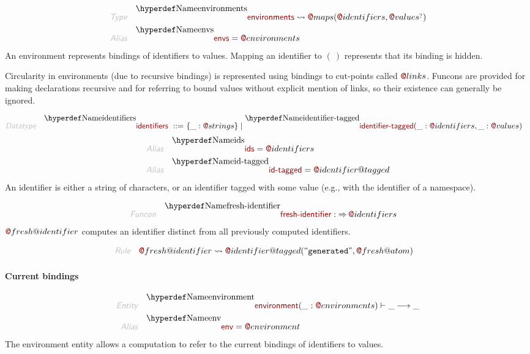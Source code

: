 \begin{align*}
  \KEY{Type} \quad 
  & \FUNDEC{environments}  
    \leadsto \FUN@maps
               (  \FUN@identifiers, 
                      \FUN@values\QUERY )
\\
  \KEY{Alias} \quad
  & \FUNDEC{envs} = \FUN@environments
\end{align*}
An environment represents bindings of identifiers to values.
  Mapping an identifier to $(   \  )$ represents that its binding is hidden.

Circularity in environments (due to recursive bindings) is represented using
  bindings to cut-points called $\FUN@links$. Funcons are provided for making
  declarations recursive and for referring to bound values without explicit
  mention of links, so their existence can generally be ignored.

\begin{align*}
  \KEY{Datatype} \quad 
  \FUNDEC{identifiers} 
  \ ::= \ &
  \{ \_ : \FUN@strings \} \mid \FUNDEC{identifier-tagged}(
                   \_ : \FUN@identifiers, \_ : \FUN@values)
\end{align*}
\begin{align*}
  \KEY{Alias} \quad
  & \FUNDEC{ids} = \FUN@identifiers
\\
  \KEY{Alias} \quad
  & \FUNDEC{id-tagged} = \FUN@identifier@tagged
\end{align*}
An identifier is either a string of characters, or an identifier tagged with
  some value (e.g., with the identifier of a namespace).

\begin{align*}
  \KEY{Funcon} \quad
  & \FUNDEC{fresh-identifier} 
    :  \TO \FUN@identifiers 
\end{align*}
$\FUN@fresh@identifier$ computes an identifier distinct from all previously
  computed identifiers.

\begin{align*}
  \KEY{Rule} \quad
    & \FUN@fresh@identifier \leadsto 
        \FUN@identifier@tagged
          (  \STRING{generated}, 
                 \FUN@fresh@atom )
\end{align*}
\paragraph{Current bindings}\hypertarget{current-bindings}{}\label{current-bindings}

\begin{align*}
  \KEY{Entity} \quad
  & \FUNDEC{environment}(\_ : \FUN@environments) \vdash \_ \TRANS  \_
\\
  \KEY{Alias} \quad
  & \FUNDEC{env} = \FUN@environment
\end{align*}
The environment entity allows a computation to refer to the current bindings
  of identifiers to values.

